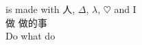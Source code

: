 \documentclass[a5paper,12pt]{article}
\title{{\normalsize \Ai}}
\author{人, I}
\date{histoday}
\begin{document}
\maketitle

\begin{center}
\Ai is made with 人, $\Delta$, $\lambda$, $\heartsuit$ and I \\

做 \Ai 做的事 \\

Do what \Ai do \\
\end{center}
\end{document}
